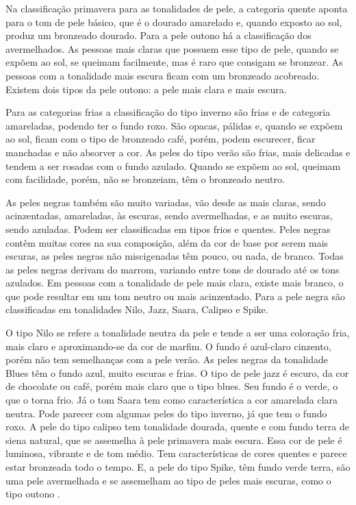 Na classificação primavera para as tonalidades de pele, a categoria quente aponta para o tom de pele básico, que é o dourado amarelado e, quando exposto ao sol, produz um bronzeado dourado.
Para a pele outono há a classificação dos avermelhados. As pessoas mais claras que possuem esse tipo de pele, quando se expõem ao sol, se queimam facilmente, mas é raro que consigam se bronzear. As pessoas com a tonalidade mais escura ficam com um bronzeado acobreado. Existem dois tipos da pele outono: a pele mais clara e mais escura. 

Para as categorias frias a classificação do tipo inverno são frias e de categoria amareladas, podendo ter o fundo roxo. São opacas, pálidas e, quando se expõem ao sol, ficam com o tipo de bronzeado café, porém, podem escurecer, ficar manchadas e não absorver a cor. As peles do tipo verão são frias, mais delicadas e tendem a ser rosadas com o fundo azulado. Quando se expõem ao sol, queimam com facilidade, porém, não se bronzeiam, têm o bronzeado neutro. 

As peles negras também são muito variadas, vão desde as mais claras, sendo acinzentadas, amareladas, às escuras, sendo avermelhadas, e as muito escuras, sendo azuladas. Podem ser classificadas em tipos frios e quentes. Peles negras contêm muitas cores na sua composição, além da cor de base por serem mais escuras, as peles negras não miscigenadas têm pouco, ou nada, de branco. Todas as peles negras derivam do marrom, variando entre tons de dourado até os tons azulados. Em pessoas com a tonalidade de pele mais clara, existe mais branco, o que pode resultar em um tom neutro ou mais acinzentado. Para a pele negra são classificadas em tonalidades Nilo, Jazz, Saara, Calipso e Spike.

O tipo Nilo se refere a tonalidade neutra da pele e tende a ser uma coloração fria, mais claro e aproximando-se da cor de marfim. O fundo é azul-claro cinzento, porém não tem semelhanças com a pele verão. As peles negras da tonalidade Blues têm o fundo azul, muito escuras e frias. O tipo de pele jazz é escuro, da cor de chocolate ou café, porém mais claro que o tipo blues. Seu fundo é o verde, o que o torna frio. Já o tom Saara tem como característica a cor amarelada clara neutra. Pode parecer com algumas peles do tipo inverno, já que tem o fundo roxo. A pele do tipo calipso tem tonalidade dourada, quente e com fundo terra de siena natural, que se assemelha à pele primavera mais escura. Essa cor de pele é luminosa, vibrante e de tom médio. Tem características de cores quentes e parece estar bronzeada todo o tempo. E, a pele do tipo Spike, têm fundo verde terra, são uma pele avermelhada e se assemelham ao tipo de peles mais escuras, como o tipo outono \cite{Visagismo}. 


